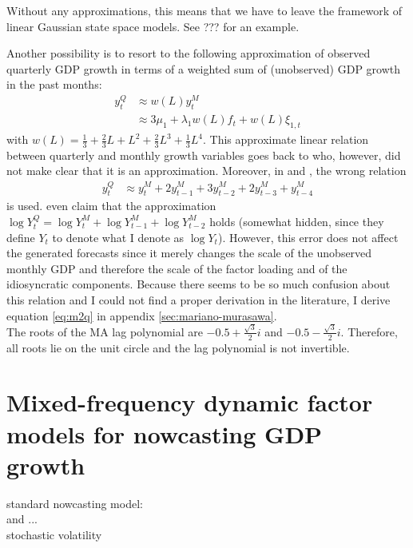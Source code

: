 \citet{ProiettiMoauro2006}
Without any approximations, this means that we have to leave the framework of linear Gaussian state space models. See ??? for an example.

Another possibility is to resort to the following approximation of observed quarterly GDP growth in terms of a weighted sum of (unobserved) GDP growth in the past months:
\begin{align}
y^Q_{t} &\approx w(L) y^M_{t} \\ \label{eq:m2q}
&\approx 3\mu_1 + \lambda_1 w(L) f_t + w(L) \xi_{1,t}
\end{align}
with $w(L) = \frac{1}{3} + \frac{2}{3} L + L^2 + \frac{2}{3} L^3 + \frac{1}{3} L^4$. This approximate linear relation between quarterly and monthly growth variables goes back to \citet{MarianoMurasawa2003} who, however, did not make clear that it is an approximation. Moreover, in \citet{LucianiRicci2014} and \citet{BanburaEtal2013}, the wrong relation
\begin{align*}
y^Q_{t} &\approx y^M_{t} + 2y^M_{t-1} + 3y^M_{t-2} + 2y^M_{t-3} + y^M_{t-4}
\end{align*}
is used. \citet[p. 239]{LucianiRicci2014} even claim that the approximation $\log Y_t^Q = \log Y_t^M + \log Y_{t-1}^M + \log Y_{t-2}^M$ holds (somewhat hidden, since they define $Y_t$ to denote what I denote as $\log Y_t$). However, this error does not affect the generated forecasts since it merely changes the scale of the unobserved monthly GDP and therefore the scale of the factor loading and of the idiosyncratic components. Because there seems to be so much confusion about this relation and I could not find a proper derivation in the literature, I derive equation \ref{eq:m2q} in appendix \ref{sec:mariano-murasawa}.\\

The roots of the MA lag polynomial are $-0.5+\frac{\sqrt{3}}{2} i$ and $-0.5-\frac{\sqrt{3}}{2} i$. Therefore, all roots lie on the unit circle and the lag polynomial is not invertible.\\


\section{Mixed-frequency dynamic factor models for nowcasting GDP growth}



standard nowcasting model: \\

\citet{LucianiRicci2014} and \citet{DAgostinoEtal2016} ... \\

\citet{MarcellinoEtal2016} stochastic volatility \\

\citet{AntolinDiazEtal2017} \\